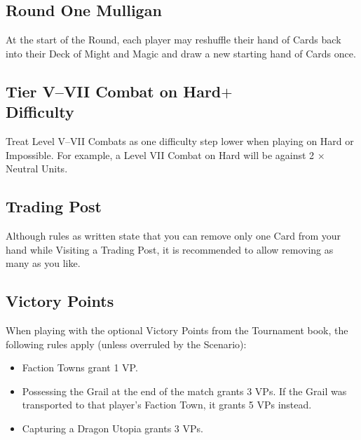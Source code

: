 \begin{multicols*}{2}
\subsection*{Round One Mulligan}

At the start of the  Round, each player may reshuffle their hand of Cards back into their Deck of Might and Magic and draw a new starting hand of Cards once.

\subsection*{Tier V--VII Combat on Hard$+$\\Difficulty}

Treat Level V--VII Combats as one difficulty step lower when playing on Hard or Impossible.
For example, a Level VII Combat on Hard will be against 2 ×  Neutral Units.

{
  \hfill
  \vspace{-3em}
}

\subsection*{Trading Post}

Although rules as written state that you can remove only one Card from your hand while Visiting a Trading Post, it is recommended to allow removing as many as you like.

\subsection*{Victory Points}

When playing with the optional Victory Points from the Tournament book, the following rules apply (unless overruled by the Scenario):
\begin{itemize}
  \item Faction Towns grant 1 VP.
  \item Possessing the Grail at the end of the match grants 3 VPs. If the Grail was transported to that player's Faction Town, it grants 5 VPs instead.
  \item Capturing a Dragon Utopia grants 3 VPs.
\end{itemize}

\end{multicols*}


